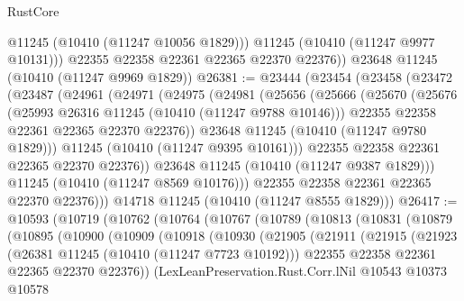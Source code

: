 \begin{lexlean}{RustCore}
\begin{coremodule}
            @11245
            (@10410 (@11247 @10056 @1829)))
          @11245
          (@10410 (@11247 @9977 @10131)))
        @22355
        @22358
        @22361
        @22365
        @22370
        @22376))
    @23648
    @11245
    (@10410 (@11247 @9969 @1829))
@26381 := @23444
    (@23454
      (@23458
        (@23472
          (@23487
            (@24961
              (@24971
                (@24975
                  (@24981
                    (@25656
                      (@25666
                        (@25670
                          (@25676
                            (@25993 @26316 @11245 (@10410 (@11247 @9788 @10146)))
                            @22355
                            @22358
                            @22361
                            @22365
                            @22370
                            @22376))
                        @23648
                        @11245
                        (@10410 (@11247 @9780 @1829)))
                      @11245
                      (@10410 (@11247 @9395 @10161)))
                    @22355
                    @22358
                    @22361
                    @22365
                    @22370
                    @22376))
                @23648
                @11245
                (@10410 (@11247 @9387 @1829)))
              @11245
              (@10410 (@11247 @8569 @10176)))
            @22355
            @22358
            @22361
            @22365
            @22370
            @22376)))
      @14718
      @11245
      (@10410 (@11247 @8555 @1829)))
@26417 := @10593
    (@10719
      (@10762
        (@10764
          (@10767
            (@10789
              (@10813
                (@10831
                  (@10879
                    (@10895
                      (@10900
                        (@10909
                          (@10918
                            (@10930
                              (@21905
                                (@21911
                                  (@21915
                                    (@21923
                                      (@26381 @11245 (@10410 (@11247 @7723 @10192)))
                                      @22355
                                      @22358
                                      @22361
                                      @22365
                                      @22370
                                      @22376))
                                  (LexLeanPreservation.Rust.Corr.lNil
                                    @10543
                                    @10373
                                    @10578

\end{coremodule}
\end{lexlean}
